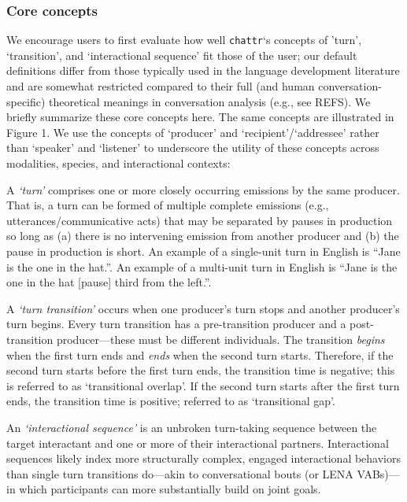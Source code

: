 \documentclass[10pt, letterpaper]{article}
\begin{document}
\hypertarget{core-concepts}{%
\subsubsection{Core concepts}\label{core-concepts}}

We encourage users to first evaluate how well \texttt{chattr}`s concepts
of 'turn', `transition', and `interactional sequence' fit those of the
user; our default definitions differ from those typically used in the
language development literature and are somewhat restricted compared to
their full (and human conversation-specific) theoretical meanings in
conversation analysis (e.g., see REFS). We briefly summarize these core
concepts here. The same concepts are illustrated in Figure 1. We use the
concepts of `producer' and `recipient'/`addressee' rather than `speaker'
and `listener' to underscore the utility of these concepts across
modalities, species, and interactional contexts:

A \emph{`turn'} comprises one or more closely occurring emissions by the
same producer. That is, a turn can be formed of multiple complete
emissions (e.g., utterances/communicative acts) that may be separated by
pauses in production so long as (a) there is no intervening emission
from another producer and (b) the pause in production is short. An
example of a single-unit turn in English is ``Jane is the one in the
hat.''. An example of a multi-unit turn in English is ``Jane is the one
in the hat {[}pause{]} third from the left.''.

A \emph{`turn transition'} occurs when one producer's turn stops and
another producer's turn begins. Every turn transition has a
pre-transition producer and a post-transition producer---these must be
different individuals. The transition \emph{begins} when the first turn
ends and \emph{ends} when the second turn starts. Therefore, if the
second turn starts before the first turn ends, the transition time is
negative; this is referred to as `transitional overlap'. If the second
turn starts after the first turn ends, the transition time is positive;
referred to as `transitional gap'.

An \emph{`interactional sequence'} is an unbroken turn-taking sequence
between the target interactant and one or more of their interactional
partners. Interactional sequences likely index more structurally
complex, engaged interactional behaviors than single turn transitions
do---akin to conversational bouts (or LENA VABs)---in which participants
can more substantially build on joint goals.
\end{document}
